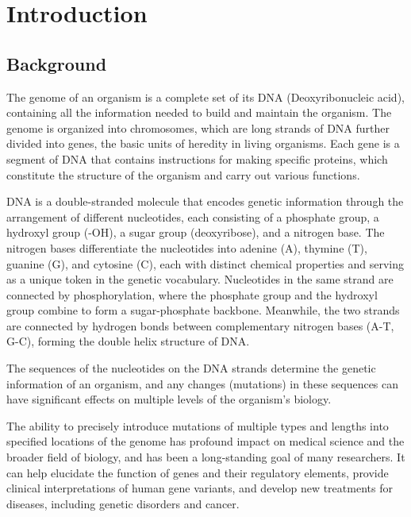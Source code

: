 \chapter{Introduction}

\minitoc

\section{Background}

The genome of an organism is a complete set of its DNA (Deoxyribonucleic acid), containing all the information needed to build and maintain the organism. The genome is organized into chromosomes, which are long strands of DNA further divided into genes, the basic units of heredity in living organisms. Each gene is a segment of DNA that contains instructions for making specific proteins, which constitute the structure of the organism and carry out various functions\cite{BrockBiologyMicroorganisms}.

DNA is a double-stranded molecule that encodes genetic information through the arrangement of different nucleotides, each consisting of a phosphate group, a hydroxyl group (-OH), a sugar group (deoxyribose), and a nitrogen base. The nitrogen bases differentiate the nucleotides into adenine (A), thymine (T), guanine (G), and cytosine (C), each with distinct chemical properties and serving as a unique token in the genetic vocabulary. Nucleotides in the same strand are connected by phosphorylation, where the phosphate group and the hydroxyl group combine to form a sugar-phosphate backbone. Meanwhile, the two strands are connected by hydrogen bonds between complementary nitrogen bases (A-T, G-C), forming the double helix structure of DNA. 

The sequences of the nucleotides on the DNA strands determine the genetic information of an organism, and any changes (mutations) in these sequences can have significant effects on multiple levels of the organism's biology\cite{BrockBiologyMicroorganisms}.

The ability to precisely introduce mutations of multiple types and lengths into specified locations of the genome has profound impact on medical science and the broader field of biology, and has been a long-standing goal of many researchers. It can help elucidate the function of genes and their regulatory elements, provide clinical interpretations of human gene variants, and develop new treatments for diseases, including genetic disorders and cancer\cite{petraityteGenomeEditingMedicine2021,dasCRISPRBasedTherapeutics2022,portoBaseEditingAdvances2020}. 

